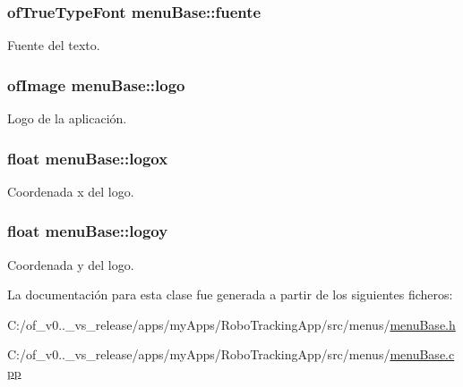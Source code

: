 \hypertarget{classmenu_base_a8c48cc67dd9d789cf5a06c61333c8db9}{}
\subsubsection[{fuente}]{\setlength{\rightskip}{0pt plus 5cm}of\+True\+Type\+Font menu\+Base\+::fuente\hspace{0.3cm}{\ttfamily [protected]}}\label{classmenu_base_a8c48cc67dd9d789cf5a06c61333c8db9}


Fuente del texto. 

\hypertarget{classmenu_base_a817536aa29cfe8f13d1e7c745e45b31d}{}
\subsubsection[{logo}]{\setlength{\rightskip}{0pt plus 5cm}of\+Image menu\+Base\+::logo\hspace{0.3cm}{\ttfamily [protected]}}\label{classmenu_base_a817536aa29cfe8f13d1e7c745e45b31d}


Logo de la aplicación. 

\hypertarget{classmenu_base_a97f2f1c174cadb12ae7b62f672fcde97}{}
\subsubsection[{logox}]{\setlength{\rightskip}{0pt plus 5cm}float menu\+Base\+::logox\hspace{0.3cm}{\ttfamily [protected]}}\label{classmenu_base_a97f2f1c174cadb12ae7b62f672fcde97}


Coordenada x del logo. 

\hypertarget{classmenu_base_a8bd56c156201d813c9c6da884cd98296}{}
\subsubsection[{logoy}]{\setlength{\rightskip}{0pt plus 5cm}float menu\+Base\+::logoy\hspace{0.3cm}{\ttfamily [protected]}}\label{classmenu_base_a8bd56c156201d813c9c6da884cd98296}


Coordenada y del logo. 



La documentación para esta clase fue generada a partir de los siguientes ficheros\+:\begin{DoxyCompactItemize}
\item 
C\+:/of\+\_\+v0..\+\_\+vs\+\_\+release/apps/my\+Apps/\+Robo\+Tracking\+App/src/menus/\hyperlink{menu_base_8h}{menu\+Base.\+h}\item 
C\+:/of\+\_\+v0..\+\_\+vs\+\_\+release/apps/my\+Apps/\+Robo\+Tracking\+App/src/menus/\hyperlink{menu_base_8cpp}{menu\+Base.\+cpp}\end{DoxyCompactItemize}
